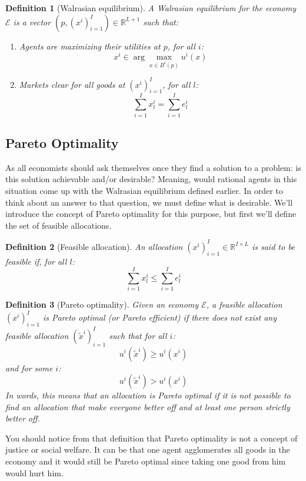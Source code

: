 \documentclass[12pt]{report}
\newtheorem{definition}{Definition}[chapter]
\begin{document}
\begin{definition}[Walrasian equilibrium]
A Walrasian equilibrium for the economy $\mathcal{E}$ is a vector $(p, (x^i)_{i=1}^{I})\in \mathbb{R}^{L+1}$ such that:\begin{enumerate}
\item Agents are maximizing their utilities at $p$, for all $i$: $$x^i \in \operatorname{arg}\max_{x\in B^i(p)} u^i(x) $$
\item Markets clear for all goods at $(x^i)_{i=1}^{I}$, for all $l$: $$ \sum_{i=1}^{I} x_l^i = \sum_{i=1}^{I} e_l^i $$
\end{enumerate}
\end{definition}

\subsection{Pareto Optimality}

As all economists should ask themselves once they find a solution to a problem: is this solution achievable and/or desirable? Meaning, would rational agents in this situation come up with the Walrasian equilibrium defined earlier. In order to think about an answer to that question, we must define what is desirable. We'll introduce the concept of Pareto optimality for this purpose, but first we'll define the set of feasible allocations.

\begin{definition}[Feasible allocation]
An allocation $(x^i)_{i=1}^{I}\in\mathbb{R}^{I\times L}$ is said to be feasible if, for all $l$: $$\sum_{i=1}^{I} x_l^i \leq \sum_{i=1}^{I} e_l^i $$
\end{definition}

\begin{definition}[Pareto optimality]
Given an economy $\mathcal{E}$, a feasible allocation $(x^i)_{i=1}^{I}$ is Pareto optimal (or Pareto efficient) if there does not exist any feasible allocation $(\tilde x^i)_{i=1}^{I}$ such that for all $i$: $$u^i(\tilde x^i)\geq u^i(x^i) $$ and for some $i$: $$u^i(\tilde x^i) > u^i(x^i) $$ In words, this means that an allocation is Pareto optimal if it is not possible to find an allocation that make everyone better off and at least one person strictly better off.
\end{definition}

You should notice from that definition that Pareto optimality is not a concept of justice or social welfare. It can be that one agent agglomerates all goods in the economy and it would still be Pareto optimal since taking one good from him would hurt him.
\end{document}
